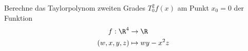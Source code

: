 \begin{prob}
Berechne das Taylorpolynom zweiten Grades $T_0^2f(x)$ am Punkt $x_0=0$ der Funktion
\begin{equation*}
        \begin{split}
            f:\R^4&\to\R\\
            (w,x,y,z) &\mapsto wy-x^2z
        \end{split}
    \end{equation*}
\end{prob}
